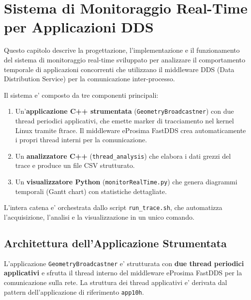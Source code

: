 
\chapter{Sistema di Monitoraggio Real-Time per Applicazioni DDS}
\label{ch:monitoraggio}

Questo capitolo descrive la progettazione, l'implementazione e il funzionamento
del sistema di monitoraggio real-time sviluppato per analizzare il comportamento
temporale di applicazioni concorrenti che utilizzano il middleware
DDS (Data Distribution Service) per la comunicazione inter-processo.

Il sistema e' composto da tre componenti principali:
\begin{enumerate}
    \item Un'\textbf{applicazione C++ strumentata} (\texttt{GeometryBroadcastner})
          con due thread periodici applicativi, che emette marker di tracciamento
          nel kernel Linux tramite ftrace. Il middleware eProsima FastDDS crea
          automaticamente i propri thread interni per la comunicazione.
    \item Un \textbf{analizzatore C++} (\texttt{thread\_analysis}) che elabora
          i dati grezzi del trace e produce un file CSV strutturato.
    \item Un \textbf{visualizzatore Python} (\texttt{monitorRealTime.py}) che
          genera diagrammi temporali (Gantt chart) con statistiche dettagliate.
\end{enumerate}

L'intera catena e' orchestrata dallo script \texttt{run\_trace.sh}, che automatizza
l'acquisizione, l'analisi e la visualizzazione in un unico comando.


\section{Architettura dell'Applicazione Strumentata}
\label{sec:architettura}

L'applicazione \texttt{GeometryBroadcastner} e' strutturata con
\textbf{due thread periodici applicativi} e sfrutta il thread interno del
middleware eProsima FastDDS per la comunicazione sulla rete.
La struttura dei thread applicativi e' derivata dal pattern dell'applicazione
di riferimento \texttt{app10h}.

